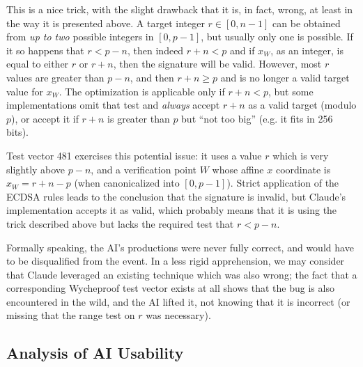 \documentclass{llncs}
\begin{document}
This is a nice trick, with the slight drawback that it is, in fact,
wrong, at least in the way it is presented above. A target integer $r\in
[0, n-1]$ can be obtained from \emph{up to two} possible integers in
$[0, p-1]$, but usually only one is possible. If it so happens that $r <
p - n$, then indeed $r + n < p$ and if $x_W$, as an integer, is equal to
either $r$ or $r + n$, then the signature will be valid. However, most
$r$ values are greater than $p - n$, and then $r + n \geq p$ and is no
longer a valid target value for $x_W$. The optimization is applicable
only if $r + n < p$, but some implementations omit that test and
\emph{always} accept $r + n$ as a valid target (modulo $p$), or accept
it if $r + n$ is greater than $p$ but ``not too big'' (e.g. it fits in
256 bits).

Test vector 481 exercises this potential issue: it uses a value $r$
which is very slightly above $p - n$, and a verification point $W$ whose
affine $x$ coordinate is $x_W = r + n - p$ (when canonicalized into $[0,
p-1]$). Strict application of the ECDSA rules leads to the conclusion
that the signature is invalid, but Claude's implementation accepts it as
valid, which probably means that it is using the trick described above
but lacks the required test that $r < p - n$.

Formally speaking, the AI's productions were never fully correct, and
would have to be disqualified from the event. In a less rigid
apprehension, we may consider that Claude leveraged an existing
technique which was also wrong; the fact that a corresponding Wycheproof
test vector exists at all shows that the bug is also encountered in the
wild, and the AI lifted it, not knowing that it is incorrect (or missing
that the range test on $r$ was necessary).

\subsection{Analysis of AI Usability}
\end{document}
